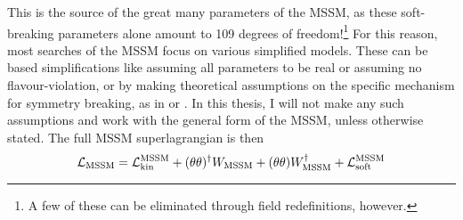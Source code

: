 \documentclass[../main.tex]{subfiles}
\begin{document}
This is the source of the great many parameters of the MSSM, as these soft-breaking parameters alone amount to 109 degrees of freedom!\footnote{A few of these can be eliminated through field redefinitions, however.}
For this reason, most searches of the MSSM focus on various simplified models\needcite.
These can be based simplifications like assuming all parameters to be real or assuming no flavour-violation, or by making theoretical assumptions on the specific mechanism for symmetry breaking, as in  or \needcite[mSUGRA].
In this thesis, I will not make any such assumptions and work with the general form of the MSSM, unless otherwise stated.
The full MSSM superlagrangian is then
\begin{equation}
  \mathcal{L}_\text{MSSM} = \mathcal{L}^\text{MSSM}_\text{kin} + (\theta\theta)^\dagger W_\text{MSSM} + (\theta\theta) W_\text{MSSM}^\dagger + \mathcal{L}^\text{MSSM}_\text{soft}
\end{equation}
\end{document}
